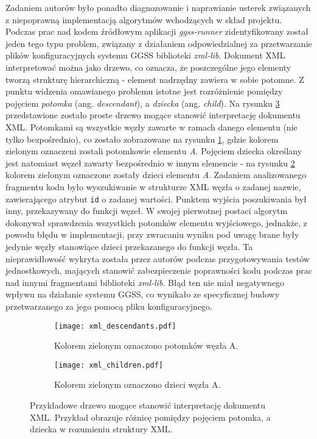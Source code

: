 Zadaniem autorów było ponadto diagnozowanie i naprawianie usterek związanych z niepoprawną implementacją algorytmów wchodzących w skład projektu. Podczas prac nad kodem źródłowym aplikacji \emph{ggss-runner} zidentyfikowany został jeden tego typu problem, związany z działaniem odpowiedzialnej za przetwarzanie plików konfiguracyjnych systemu GGSS biblioteki \emph{xml-lib}. Dokument XML interpretować można jako drzewo, co oznacza, że poszczególne jego elementy tworzą strukturę hierarchiczną - element nadrzędny zawiera w sobie potomne. Z punktu widzenia omawianego problemu istotne jest rozróżnienie pomiędzy pojęciem \emph{potomka} (ang. \emph{descendant}), a \emph{dziecka} (ang. \emph{child}). Na rysunku \ref{fig:xml_example} przedstawione zostało proste drzewo mogące stanowić interpretację dokumentu XML. Potomkami są wszystkie węzły zawarte w ramach danego elementu (nie tylko bezpośrednio), co zostało zobrazowane na rysunku \ref{fig:xml_descendant}, gdzie kolorem zielonym oznaczeni zostali potomkowie elementu \emph{A}. Pojęciem dziecka określany jest natomiast węzeł zawarty bezpośrednio w innym elemencie - na rysunku \ref{fig:xml:children} kolorem zielonym oznaczone zostały dzieci elementu \emph{A}. Zadaniem analizowanego fragmentu kodu było wyszukiwanie w strukturze XML węzła o zadanej nazwie, zawierającego atrybut \lstinline{id} o zadanej wartości. Punktem wyjścia poszukiwania był inny, przekazywany do funkcji węzeł. W swojej pierwotnej postaci algorytm dokonywał sprawdzenia wszystkich potomków elementu wyjściowego, jednakże, z powodu błędu w implementacji, przy zwracaniu wyniku pod uwagę brane były jedynie węzły stanowiące dzieci przekazanego do funkcji węzła. Ta nieprawidłowość wykryta została przez autorów podczas przygotowywania testów jednostkowych, mających stanowić zabezpieczenie poprawności kodu podczas prac nad innymi fragmentami biblioteki \emph{xml-lib}. Błąd ten nie miał negatywnego wpływu na działanie systemu GGSS, co wynikało ze specyficznej budowy przetwarzanego za jego pomocą pliku konfiguracyjnego. 

\begin{figure}[H]
\centering

\begin{subfigure}{0.48\textwidth}
\centering
\texttt{[image: xml\_descendants.pdf]}
\caption{Kolorem zielonym oznaczono potomków węzła A.}
\label{fig:xml_descendant}
\end{subfigure}
\begin{subfigure}{0.48\textwidth}
\centering
\texttt{[image: xml\_children.pdf]}
\caption{Kolorem zielonym oznaczono dzieci węzła A.}
\label{fig:xml:children}
\end{subfigure}

\caption{Przykładowe drzewo mogące stanowić interpretację dokumentu XML. Przykład obrazuje różnicę pomiędzy pojęciem potomka, a dziecka w rozumieniu struktury XML. }
\label{fig:xml_example}
\end{figure}

